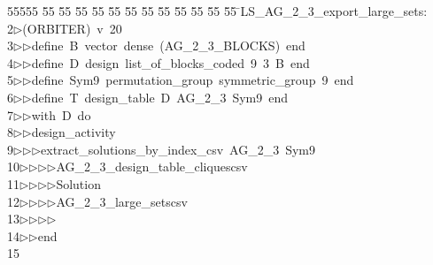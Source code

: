 %
%
\begin{tabbing}
55555 \= 55 \= 55 \= 55 \= 55 \= 55 \= 55 \= 55 \= 55 \= 55 \= 55 \= 55 \= 55 \= \>LS\_AG\_2\_3\_export\_large\_sets:\\[0pt]
2\>$\triangleright$\>(ORBITER)\ v\ 20\ \\[0pt]
3\>$\triangleright$\>$\triangleright$\>define\ B\ vector\ dense\ (AG\_2\_3\_BLOCKS)\ end\ \\[0pt]
4\>$\triangleright$\>$\triangleright$\>define\ D\ design\ list\_of\_blocks\_coded\ 9\ 3\ B\ end\ \\[0pt]
5\>$\triangleright$\>$\triangleright$\>define\ Sym9\ permutation\_group\ symmetric\_group\ 9\ end\ \\[0pt]
6\>$\triangleright$\>$\triangleright$\>define\ T\ design\_table\ D\ AG\_2\_3\ Sym9\ end\ \\[0pt]
7\>$\triangleright$\>$\triangleright$\>with\ D\ do\ \\[0pt]
8\>$\triangleright$\>$\triangleright$\>design\_activity\ \\[0pt]
9\>$\triangleright$\>$\triangleright$\>$\triangleright$\>extract\_solutions\_by\_index\_csv\ AG\_2\_3\ Sym9\ \\[0pt]
10\>$\triangleright$\>$\triangleright$\>$\triangleright$\>$\triangleright$\>AG\_2\_3\_design\_table\_cliquescsv\ \\[0pt]
11\>$\triangleright$\>$\triangleright$\>$\triangleright$\>$\triangleright$\>Solution\ \\[0pt]
12\>$\triangleright$\>$\triangleright$\>$\triangleright$\>$\triangleright$\>AG\_2\_3\_large\_setscsv\ \\[0pt]
13\>$\triangleright$\>$\triangleright$\>$\triangleright$\>$\triangleright$\>\ \\[0pt]
14\>$\triangleright$\>$\triangleright$\>end\\[0pt]
15\>\end{tabbing}
